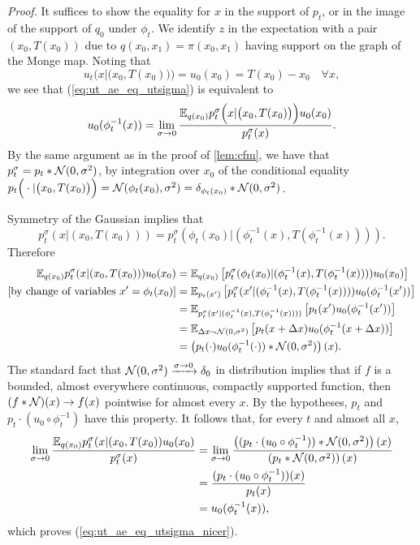 \documentclass[10pt]{article}
\theoremstyle{plain}
\theoremstyle{definition}
\theoremstyle{remark}
\begin{document}
\begin{proofE}
\textit{Proof.} It suffices to show the equality for $x$ in the support of $p_t$, or in the image of the support of $q_0$ under $\phi_t$. We identify $z$ in the expectation with a pair $(x_0,T(x_0))$ due to $q(x_0,x_1)=\pi(x_0,x_1)$ having support on the graph of the Monge map. Noting that \[u_t\Big (x|\big(x_0,T(x_0)\big) \Big)=u_0(x_0)=T(x_0)-x_0\quad\forall x,\] we see that (\ref{eq:ut_ae_eq_utsigma}) is equivalent to
\begin{equation}\label{eq:ut_ae_eq_utsigma_nicer}
u_0(\phi_t^{-1}(x))=\lim_{\sigma\to0}\frac{\mathbb{E}_{q(x_0)}p_t^\sigma \Big(x|\big (x_0,T(x_0)\big ) \Big) u_0(x_0)}{p_t^\sigma(x)}.
\end{equation}
By the same argument as in the proof of \autoref{lem:cfm}, we have that $p_t^\sigma=p_t*{\cal N}(0,\sigma^2)$, by integration over $x_0$ of the conditional equality $p_t \Big(\cdot|\big(x_0,T(x_0)\big)\Big)={\cal N}(\phi_t(x_0),\sigma^2)=\delta_{\phi_t(x_0)}*{\cal N}(0,\sigma^2)$.

Symmetry of the Gaussian implies that \[p_t^\sigma(x|(x_0,T(x_0)))=p_t^\sigma(\phi_t(x_0)|(\phi_t^{-1}(x),T(\phi_t^{-1}(x)))).\] Therefore
\begin{align*}
\mathbb{E}_{q(x_0)}p_t^\sigma(x|(x_0,T(x_0)))u_0(x_0)
&=
\mathbb{E}_{q(x_0)}\left[p_t^\sigma(\phi_t(x_0)|(\phi_t^{-1}(x),T(\phi_t^{-1}(x))))u_0(x_0)\right]\\
\text{[by change of variables $x'=\phi_t(x_0)$]}
&=\mathbb{E}_{p_t(x')}\left[p_t^\sigma(x'|(\phi_t^{-1}(x),T(\phi_t^{-1}(x))))u_0(\phi_t^{-1}(x'))\right]\\
&=\mathbb{E}_{p_t^\sigma(x'|(\phi_t^{-1}(x),T(\phi_t^{-1}(x))))}\left[p_t(x')u_0(\phi_t^{-1}(x'))\right]\\
&=\mathbb{E}_{\Delta x\sim{\cal N}(0,\sigma^2)}\left[p_t(x+\Delta x)u_0(\phi_t^{-1}(x+\Delta x))\right]\\
&=\left( p_t(\cdot)u_0(\phi_t^{-1}(\cdot))*{\cal N}(0,\sigma^2)\right)(x).
\end{align*}
The standard fact that ${\cal N}(0,\sigma^2)\xrightarrow{\sigma\to0}\delta_0$ in distribution implies that if $f$ is a bounded, almost everywhere continuous, compactly supported function, then $(f*{\cal N})(x)\to f(x)$ pointwise for almost every $x$. By the hypotheses, $p_t$ and $p_t\cdot(u_0\circ\phi_t^{-1})$ have this property. It follows that, for every $t$ and almost all $x$,
\begin{align*}
\lim_{\sigma\to0}\frac{\mathbb{E}_{q(x_0)}p_t^\sigma(x|(x_0,T(x_0))u_0(x_0)}{p_t^\sigma(x)}
&=\lim_{\sigma\to0}\frac{\left((p_t\cdot(u_0\circ\phi_t^{-1}))*{\cal N}(0,\sigma^2)\right)(x)}{\left(p_t*{\cal N}(0,\sigma^2)\right)(x)}\\
&=\frac{(p_t\cdot(u_0\circ\phi_t^{-1}))(x)}{p_t(x)}\\
&=u_0(\phi_t^{-1}(x)),
\end{align*}
which proves (\ref{eq:ut_ae_eq_utsigma_nicer}).
\end{proofE}
%
\end{document}
